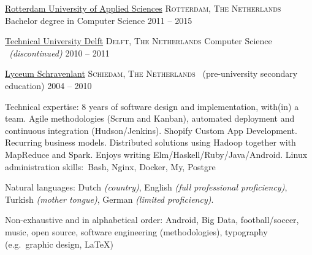 \documentclass[10pt,a4paper]{article}
\begin{document}
\newpage

\spacedhrule{-0.2em}{-0.4em}


\headedsection
  {\href{http://www.rotterdamuniversity.com}{Rotterdam University of Applied Sciences}}
  {\textsc{Rotterdam, The Netherlands}} {%
  \headedsubsection
    {Bachelor degree in Computer Science}
    {2011 -- 2015}
    {}
}

\headedsection
  {\href{http://www.tudelft.nl/en}{Technical University Delft}}
  {\textsc{Delft, The Netherlands}} {%
  \headedsubsection
    {Computer Science \textnormal{\textit{~(discontinued)}}}
    {2010 -- 2011} {}
}

\headedsection
  {\href{http://www.lyceumschravenlant.nl}{Lyceum Schravenlant}}
  {\textsc{Schiedam, The Netherlands}} {%
  \headedsubsection
    { \textnormal{~(pre-university secondary education)}}
    {2004 -- 2010} {}
}


\spacedhrule{0.5em}{-0.4em}


\inlineheadsection  %
  {Technical expertise:}
  {8 years of software design and implementation, with(in) a team. Agile methodologies (Scrum and Kanban), automated deployment and continuous integration (Hudson/Jenkins). Shopify Custom App Development. Recurring business models. Distributed solutions using Hadoop together with MapReduce and Spark. Enjoys writing Elm/\nsp Haskell/\nsp Ruby/\nsp  Java/\nsp Android. Linux administration skills:\ Bash, Nginx, Docker,  My, Postgre}

\vspace{0.5em}
\inlineheadsection
  {Natural languages:}
  {Dutch \emph{(country)}, English \emph{(full professional proficiency)}, Turkish \emph{(mother tongue)}, German \emph{(limited proficiency)}.}


\spacedhrule{1.6em}{-0.4em}


\inlineheadsection
  {Non-exhaustive and in alphabetical order:}
  {Android, Big Data, football/soccer, music, open source, software engineering (methodologies), typography (e.g.\ graphic design, \LaTeX)}
\end{document}
